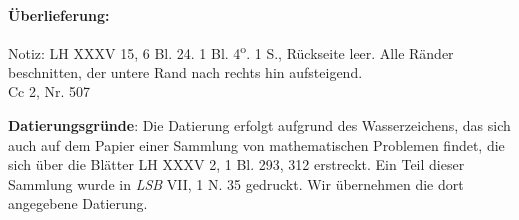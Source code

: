    
        
        \begin{ledgroupsized}[r]{120mm}
        \footnotesize 
        \pstart        
        \noindent\textbf{\"{U}berlieferung:}  
        \pend
        \end{ledgroupsized}
      
       
              \begin{ledgroupsized}[r]{114mm}
              \footnotesize 
              \pstart \parindent -6mm
              Notiz: LH XXXV 15, 6 Bl. 24. 1 Bl. 4\textsuperscript{o}. 1 S., R\"{u}ckseite leer. Alle R\"{a}nder be\-schnitten, der untere Rand nach rechts hin aufsteigend.\\Cc 2, Nr. 507 \pend
              \end{ledgroupsized}
        \vspace*{5mm}
        \begin{ledgroup}
        \footnotesize 
        \pstart
      \noindent\footnotesize{\textbf{Datierungsgr\"{u}nde}: Die Datierung erfolgt aufgrund des Wasserzeichens, das sich auch auf dem Papier einer Sammlung von mathematischen Problemen findet, die sich \"{u}ber die Bl\"{a}tter LH XXXV 2, 1 Bl. 293, 312 erstreckt. Ein Teil dieser Sammlung wurde in \textit{LSB} VII, 1 N. 35 gedruckt. Wir \"{u}bernehmen die dort angegebene Datierung.}
        \pend
        \end{ledgroup}
      
